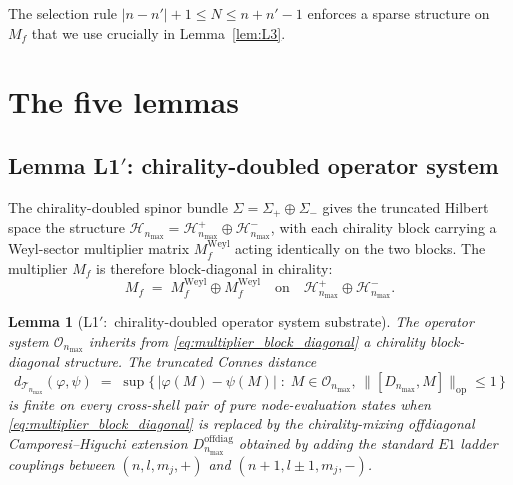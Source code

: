 \documentclass[11pt,a4paper]{article}
\theoremstyle{plain}
\newtheorem{lemma}[theorem]{Lemma}
\theoremstyle{definition}
\newcommand{\nmax}{n_{\max}}
\newcommand{\Hilb}{\mathcal{H}}
\newcommand{\Op}{\mathcal{O}}
\newcommand{\Tcal}{\mathcal{T}}
\newcommand{\opnorm}[1]{\lVert #1 \rVert_{\mathrm{op}}}
\newcommand{\Mat}{M}
\begin{document}
The selection rule $|n - n'| + 1 \le N \le n + n' - 1$ enforces a
sparse structure on $\Mat_f$ that we use crucially in
Lemma~\ref{lem:L3}.

\section{The five lemmas}\label{sec:lemmas}

\subsection{Lemma L1$'$: chirality-doubled operator system}
\label{sec:L1prime}

The chirality-doubled spinor bundle $\Sigma = \Sigma_+ \oplus \Sigma_-$
gives the truncated Hilbert space the structure
$\Hilb_{\nmax} = \Hilb^+_{\nmax} \oplus \Hilb^-_{\nmax}$, with each
chirality block carrying a Weyl-sector multiplier matrix
$\Mat_f^{\mathrm{Weyl}}$ acting identically on the two blocks. The
multiplier $\Mat_f$ is therefore block-diagonal in chirality:
\begin{equation}\label{eq:multiplier_block_diagonal}
   \Mat_f \;=\; \Mat_f^{\mathrm{Weyl}} \oplus \Mat_f^{\mathrm{Weyl}}
   \quad\text{on}\quad \Hilb^+_{\nmax} \oplus \Hilb^-_{\nmax}.
\end{equation}

\begin{lemma}[L1$'$:\ chirality-doubled operator system substrate]
\label{lem:L1prime}
The operator system $\Op_{\nmax}$ inherits from
\eqref{eq:multiplier_block_diagonal} a chirality block-diagonal
structure. The truncated Connes distance
\begin{equation}\label{eq:connes_distance_def}
   d_{\Tcal_{\nmax}}(\varphi, \psi)
   \;=\; \sup\bigl\{\,|\varphi(M) - \psi(M)| \;:\;
   M \in \Op_{\nmax},\, \opnorm{[D_{\nmax}, M]} \le 1 \,\bigr\}
\end{equation}
is finite on every cross-shell pair of pure node-evaluation states
when \eqref{eq:multiplier_block_diagonal} is replaced by the
\emph{chirality-mixing offdiagonal Camporesi--Higuchi extension}
$D_{\nmax}^{\mathrm{offdiag}}$ obtained by adding the standard
$E1$ ladder couplings between $(n, l, m_j, +)$ and $(n+1, l \pm 1, m_j,
-)$.
\end{lemma}
\end{document}
